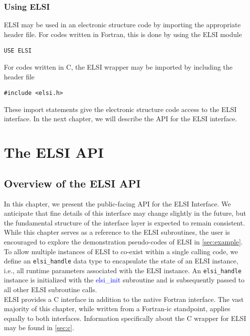 \documentclass{report}
\begin{document}
\subsection{Using ELSI}
\label{subsec:import_use}
ELSI may be used in an electronic structure code by importing the appropriate header file.  For codes written in Fortran, this is done by using the ELSI module\\

\begin{verbatim}
USE ELSI
\end{verbatim}

For codes written in C, the ELSI wrapper may be imported by including the header file\\

\begin{verbatim}
#include <elsi.h>
\end{verbatim}

These import statements give the electronic structure code access to the ELSI interface.  In the next chapter, we will describe the API for the ELSI interface.

\chapter{The ELSI API}
\section{Overview of the ELSI API}
\label{sec:api}

In this chapter, we present the public-facing API for the ELSI Interface.  We anticipate that fine details of this interface may change slightly in the future, but the fundamental structure of the interface layer is expected to remain consistent.  While this chapter serves as a reference to the ELSI subroutines, the user is encouraged to explore the demonstration pseudo-codes of ELSI in \ref{sec:example}.\\

To allow multiple instances of ELSI to co-exist within a single calling code, we define an \texttt{elsi\_handle} data type to encapsulate the state of an ELSI instance, i.e., all runtime parameters associated with the ELSI instance.  An \texttt{elsi\_handle} instance is initialized with the \textcolor{blue}{elsi\_init} subroutine and is subsequently passed to all other ELSI subroutine calls.\\

ELSI provides a C interface in addition to the native Fortran interface.  The vast majority of this chapter, while written from a Fortran-ic standpoint, applies equally to both interfaces.  Information specifically about the C wrapper for ELSI may be found in \ref{sec:c}.\\
\end{document}
